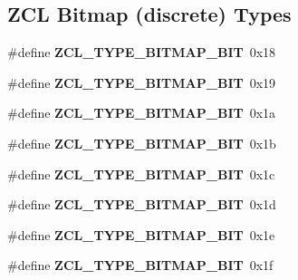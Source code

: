 \subsection*{Z\+CL Bitmap (discrete) Types}
\begin{DoxyCompactItemize}
\item 
\mbox{\label{group__zcl__types_ga7db6654381619b6523ad087ad614d988}} 
\#define {\bfseries Z\+C\+L\+\_\+\+T\+Y\+P\+E\+\_\+\+B\+I\+T\+M\+A\+P\+\_\+B\+IT}~0x18
\item 
\mbox{\label{group__zcl__types_ga7f886220f979f20cda20f09f964add37}} 
\#define {\bfseries Z\+C\+L\+\_\+\+T\+Y\+P\+E\+\_\+\+B\+I\+T\+M\+A\+P\+\_\+B\+IT}~0x19
\item 
\mbox{\label{group__zcl__types_gab977574080a1b9109cbedeb50a8231ac}} 
\#define {\bfseries Z\+C\+L\+\_\+\+T\+Y\+P\+E\+\_\+\+B\+I\+T\+M\+A\+P\+\_\+B\+IT}~0x1a
\item 
\mbox{\label{group__zcl__types_gac8c24fce4d0c613af9f391c9752f4bc8}} 
\#define {\bfseries Z\+C\+L\+\_\+\+T\+Y\+P\+E\+\_\+\+B\+I\+T\+M\+A\+P\+\_\+B\+IT}~0x1b
\item 
\mbox{\label{group__zcl__types_ga353d00de31faa429445b5d810db284d9}} 
\#define {\bfseries Z\+C\+L\+\_\+\+T\+Y\+P\+E\+\_\+\+B\+I\+T\+M\+A\+P\+\_\+B\+IT}~0x1c
\item 
\mbox{\label{group__zcl__types_ga0e677ca1f39270eb85ddc76661003b93}} 
\#define {\bfseries Z\+C\+L\+\_\+\+T\+Y\+P\+E\+\_\+\+B\+I\+T\+M\+A\+P\+\_\+B\+IT}~0x1d
\item 
\mbox{\label{group__zcl__types_gace8326adb7b2c3547039391c137b9656}} 
\#define {\bfseries Z\+C\+L\+\_\+\+T\+Y\+P\+E\+\_\+\+B\+I\+T\+M\+A\+P\+\_\+B\+IT}~0x1e
\item 
\mbox{\label{group__zcl__types_gad4df5246a0d9037921bbae054f5e249c}} 
\#define {\bfseries Z\+C\+L\+\_\+\+T\+Y\+P\+E\+\_\+\+B\+I\+T\+M\+A\+P\+\_\+B\+IT}~0x1f
\end{DoxyCompactItemize}
